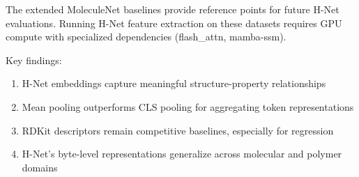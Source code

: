 The extended MoleculeNet baselines provide reference points for future H-Net evaluations. Running H-Net feature extraction on these datasets requires GPU compute with specialized dependencies (flash\_attn, mamba-ssm).

Key findings:
\begin{enumerate}
    \item H-Net embeddings capture meaningful structure-property relationships
    \item Mean pooling outperforms CLS pooling for aggregating token representations
    \item RDKit descriptors remain competitive baselines, especially for regression
    \item H-Net's byte-level representations generalize across molecular and polymer domains
\end{enumerate}







